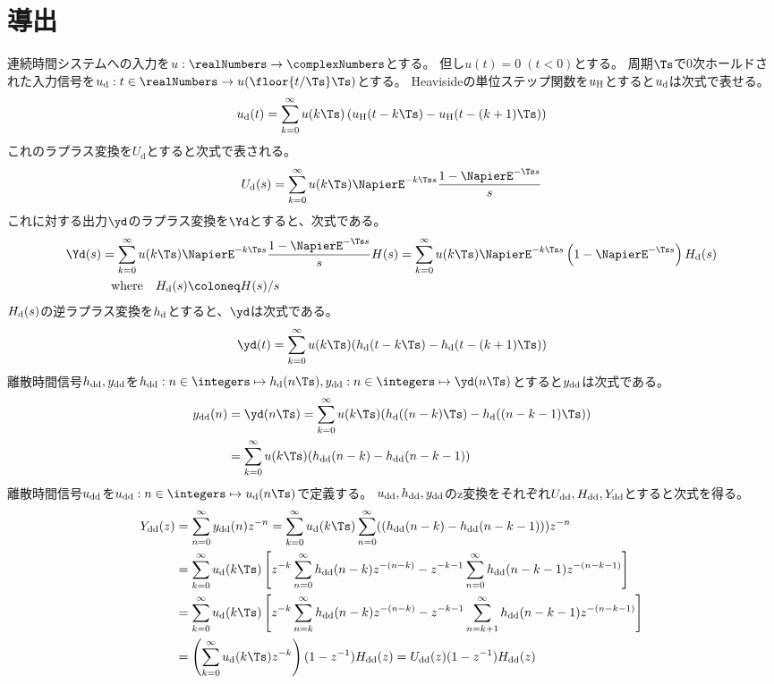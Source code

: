     \section{導出}
        連続時間システムへの入力を$u:\realNumbers\to\complexNumbers$とする。
        但し$u(t)=0\;(t<0)$とする。
        周期$\Ts$で0次ホールドされた入力信号を$\ud:t\in\realNumbers\to u(\floor{t/\Ts}\Ts)$とする。
        Heavisideの単位ステップ関数を$u_\text{H}$とすると$u_\text{d}$は次式で表せる。
        \[ \ud(t) = \sum_{k=0}^\infty u(k\Ts)\left(\uH(t-k\Ts) - \uH(t-(k+1)\Ts)\right) \]
        これのラプラス変換を$U_\text{d}$とすると次式で表される。
        \[ \Ud(s) = \sum_{k=0}^\infty u(k\Ts)\NapierE^{-k\Ts s}\frac{1-\NapierE^{-\Ts s}}{s} \]
        これに対する出力$\yd$のラプラス変換を$\Yd$とすると、次式である。
        \begin{align*}
            \Yd(s) &= \sum_{k=0}^\infty u(k\Ts)\NapierE^{-k\Ts s}\frac{1-\NapierE^{-\Ts s}}{s}H(s) = \sum_{k=0}^\infty u(k\Ts)\NapierE^{-k\Ts s}\left(1-\NapierE^{-\Ts s}\right)\Hd(s) \\
            &\phantom{=} \text{where} \quad \Hd(s) \coloneq H(s)/s
        \end{align*}
        $H_\text{d}(s)$の逆ラプラス変換を$h_\text{d}$とすると、$\yd$は次式である。
        \[ \yd(t) = \sum_{k=0}^\infty u(k\Ts)(\hd(t-k\Ts)-\hd(t-(k+1)\Ts)) \]
        離散時間信号$h_\text{dd},y_\text{dd}$を$\hdd:n\in\integers\mapsto \hd(n\Ts),\ydd:n\in\integers\mapsto \yd(n\Ts)$とすると$y_\text{dd}$は次式である。
        \begin{align*}
            \ydd(n) &= \yd(n\Ts) = \sum_{k=0}^\infty u(k\Ts)(\hd((n-k)\Ts)-\hd((n-k-1)\Ts)) \\
            &= \sum_{k=0}^\infty u(k\Ts)(\hdd(n-k)-\hdd(n-k-1))
        \end{align*}
        離散時間信号$u_\text{dd}$を$\udd:n\in\integers\mapsto\ud(n\Ts)$で定義する。
        $u_\text{dd},h_\text{dd},y_\text{dd}$のz変換をそれぞれ$U_\text{dd},H_\text{dd},Y_\text{dd}$とすると次式を得る。
        \begin{align*}
            \Ydd(z) &= \sum_{n=0}^\infty \ydd(n) z^{-n} = \sum_{k=0}^\infty \ud(k\Ts) \sum_{n=0}^\infty ((\hdd(n-k)-\hdd(n-k-1))) z^{-n} \\
            &= \sum_{k=0}^\infty \ud(k\Ts)\left[z^{-k}\sum_{n=0}^\infty \hdd(n-k)z^{-(n-k)} - z^{-k-1}\sum_{n=0}^\infty \hdd(n-k-1)z^{-(n-k-1)}\right] \\
            &= \sum_{k=0}^\infty \ud(k\Ts)\left[z^{-k}\sum_{n=k}^\infty \hdd(n-k)z^{-(n-k)} - z^{-k-1}\sum_{n=k+1}^\infty \hdd(n-k-1)z^{-(n-k-1)}\right] \\
            &= \left(\sum_{k=0}^\infty \ud(k\Ts)z^{-k}\right)(1-z^{-1})\Hdd(z) = \Udd(z)(1-z^{-1})\Hdd(z)
        \end{align*}